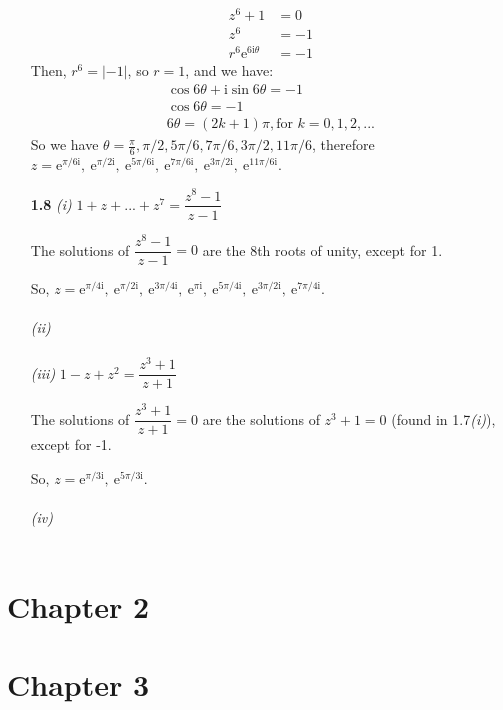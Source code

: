 \documentclass{article}
\begin{document}
\begin{enumerate}
\begin{align*}
    z^6+1 &= 0 \\
    z^6   &= -1 \\
    r^6\mathrm{e}^{6\mathrm{i}\theta} &= -1
\end{align*}
Then, $r^6 = |-1|$, so $ r=1$, and we have:
\begin{gather*}
  \cos 6\theta + \mathrm{i} \sin 6\theta = -1 \\
  \cos 6\theta = -1 \\
  6\theta = (2k+1)\pi, \text{for } k = 0, 1, 2, ...
\end{gather*}
So we have 
$\theta = \frac{\pi}{6}, \pi/2, 5\pi/6, 7\pi/6, 3\pi/2, 11\pi/6$, 
therefore 
$z = \mathrm{e}^{\pi/6\mathrm{i}}, \:
\mathrm{e}^{\pi/2\mathrm{i}},\:
\mathrm{e}^{5\pi/6\mathrm{i}},\:
\mathrm{e}^{7\pi/6\mathrm{i}},\:
\mathrm{e}^{3\pi/2\mathrm{i}},\:
\mathrm{e}^{11\pi/6\mathrm{i}}
$.

\item[\textbf{1.8}] 
\textit{(i)}
$1+z+...+z^7 = \dfrac{z^8-1}{z-1}$

The solutions of $\dfrac{z^8-1}{z-1} = 0$ are the 8th roots of unity, except for 1. 

So, $z = \mathrm{e}^{\pi/4\mathrm{i}}, \:
\mathrm{e}^{\pi/2\mathrm{i}},\:
\mathrm{e}^{3\pi/4\mathrm{i}},\:
\mathrm{e}^{\pi\mathrm{i}},\:
\mathrm{e}^{5\pi/4\mathrm{i}},\:
\mathrm{e}^{3\pi/2\mathrm{i}}, \:
\mathrm{e}^{7\pi/4\mathrm{i}}
$.
\\\\
\textit{(ii)}
\\\\
\textit{(iii)}
$1-z+z^2 = \dfrac{z^3+1}{z+1}$

The solutions of $\dfrac{z^3+1}{z+1} = 0$ are the solutions of $z^3+1 = 0$ (found in 1.7\textit{(i)}), except for -1. 

So, $z = \mathrm{e}^{\pi/3\mathrm{i}}, \:
\mathrm{e}^{5\pi/3\mathrm{i}}
$.
\\\\
\textit{(iv)}
\\\\

\end{enumerate}
\section{Chapter 2}

\section{Chapter 3}
\end{document}
